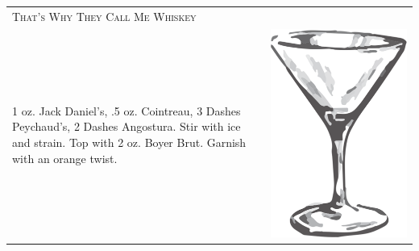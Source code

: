 \documentclass{article}
\begin{document}
\begin{tabular}{p{2in} p{0.5in}}
  \multicolumn{2}{p{3in}}{\centering\Huge\textsc{That's Why They Call Me Whiskey}} \\ 
  
   \vspace{-0.1in}1 oz. Jack Daniel's, .5 oz. Cointreau, 3 Dashes Peychaud's,
    2 Dashes Angostura. Stir with ice and strain. Top with 2 oz.
    Boyer Brut. Garnish with an orange twist. &
   \vspace{-0.1in} \includegraphics{goblet.png}
\end{tabular}
\end{document}
